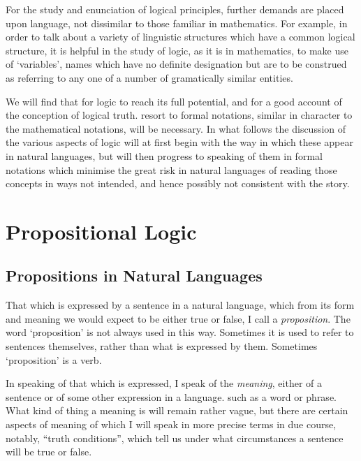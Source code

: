 \documentclass[10pt,titlepage]{book}
\begin{document}
For the study and enunciation of logical principles, further demands are placed upon language, not dissimilar to those familiar in mathematics.
For example, in order to talk about a variety of linguistic structures which have a common logical structure, it is helpful in the study of logic, as it is in mathematics, to make use of `variables', names which have no definite designation but are to be construed as referring to any one of a number of gramatically similar entities.

We will find that for logic to reach its full potential, and for a good account of the conception of logical truth. resort to formal notations, similar in character to the mathematical notations, will be necessary.
In what follows the discussion of the various aspects of logic will at first begin with the way in which these appear in natural languages, but will then progress to speaking of them in formal notations which minimise the great risk in natural languages of reading those concepts in ways not intended, and hence possibly not consistent with the story.

\section{Propositional Logic}

\subsection{Propositions in Natural Languages}

That which is expressed by a sentence in a natural language, which from its form and meaning we would expect to be either true or false, I call a {\it proposition}.
The word `proposition' is not always used in this way.
Sometimes it is used to refer to sentences themselves, rather than what is expressed by them.
Sometimes `proposition' is a verb.

In speaking of that which is expressed, I speak of the \emph{meaning}, either of a sentence or of some other expression in a language. such as a word or phrase.
What kind of thing a meaning is will remain rather vague, but there are certain aspects of meaning of which I will speak in more precise terms in due course, notably, ``truth conditions'', which tell us under what circumstances a sentence will be true or false.
\end{document}
